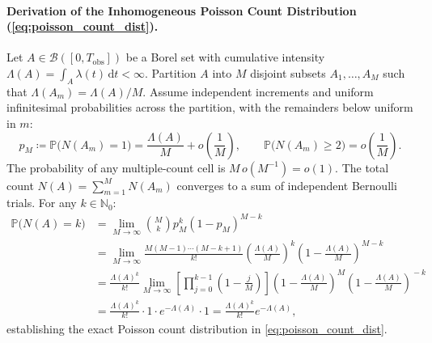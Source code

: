 \paragraph{Derivation of the Inhomogeneous Poisson Count
Distribution (\cref{eq:poisson_count_dist}).}
Let $A \in \mathcal{B}([0, T_{\mathrm{obs}}])$ be a Borel set with cumulative
intensity $\Lambda(A) = \int_A \lambda(t)\,\mathrm{d}t < \infty$. Partition $A$
into $M$ disjoint subsets $A_1, \dots, A_M$ such that $\Lambda(A_m)
= \Lambda(A)/M$.
Assume independent increments and uniform infinitesimal probabilities
across the partition, with the remainders below uniform in $m$:
\begin{equation}
  p_M \coloneqq \mathbb{P}\bigl(N(A_m) = 1\bigr) =
  \frac{\Lambda(A)}{M} + o\left(\frac{1}{M}\right), \qquad
  \mathbb{P}\bigl(N(A_m) \ge 2\bigr) = o\left(\frac{1}{M}\right).
\end{equation}
The probability of any multiple-count cell is $M\,o(M^{-1})=o(1)$.
The total count $N(A) = \sum_{m=1}^M
N(A_m)$ converges
to a sum of independent Bernoulli trials. For any $k \in \mathbb{N}_0$:
\begin{equation}
  \begin{aligned}
    \mathbb{P}\bigl(N(A) = k\bigr)
    &= \lim_{M \to \infty} \binom{M}{k} p_M^k (1 - p_M)^{M - k} \\
    &= \lim_{M \to \infty} \frac{M(M-1)\cdots(M-k+1)}{k!} \left(
    \frac{\Lambda(A)}{M} \right)^{\!k} \left( 1 -
    \frac{\Lambda(A)}{M} \right)^{\!M - k} \\
    &= \frac{\Lambda(A)^k}{k!} \lim_{M \to \infty} \left[
    \prod_{j=0}^{k-1}\left(1 - \frac{j}{M}\right) \right] \left( 1 -
    \frac{\Lambda(A)}{M} \right)^{\!M} \left( 1 -
    \frac{\Lambda(A)}{M} \right)^{\!-k} \\
    &= \frac{\Lambda(A)^k}{k!} \cdot 1 \cdot e^{-\Lambda(A)} \cdot 1
    = \frac{\Lambda(A)^k}{k!} e^{-\Lambda(A)},
  \end{aligned}
  \label{eq:supp_poisson_limit}
\end{equation}
establishing the exact Poisson count distribution in
\cref{eq:poisson_count_dist}.

